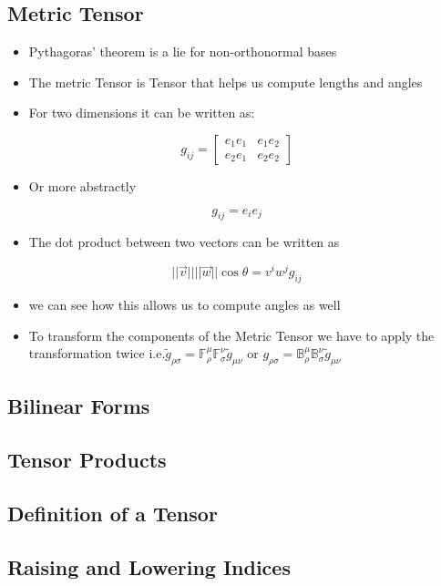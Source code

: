 \subsection{Metric Tensor}
\begin{itemize}
	\item Pythagoras' theorem is a lie for non-orthonormal bases
	\item The metric Tensor is Tensor that helps us compute lengths and angles
	\item For two dimensions it can be written as:
\end{itemize}
$$\textit{g}_{ij} = \begin{bmatrix}
	e_{1}e_{1} & e_{1}e_{2} \\
	e_{2}e_{1} & e_{2}e_{2} 
\end{bmatrix}$$
\begin{itemize}
	\item Or more abstractly
\end{itemize}
$$\textit{g}_{ij} = e_{i}e_{j}$$
\begin{itemize}
	\item The dot product between two vectors can be written as
\end{itemize}
$$||\vec{v}|| ||\vec{w}||\cos{\theta} = v^{i}w^{j}\textit{g}_{ij}$$
\begin{itemize}
	\item we can see how this allows us to compute angles as well
	\item To transform the components of the Metric Tensor we have to apply the transformation twice i.e.$\tilde{g}_{\rho \sigma} = \mathbb{F}^{\mu}_{\rho} \mathbb{F}^{\nu}_{\sigma}\tilde{g}_{\mu \nu}$ or $g_{\rho \sigma} = \mathbb{B}^{\mu}_{\rho} \mathbb{B}^{\nu}_{\sigma}\tilde{g}_{\mu \nu}$
\end{itemize}

\subsection{Bilinear Forms}

\subsection{Tensor Products}

\subsection{Definition of a Tensor}

\subsection{Raising and Lowering Indices}
